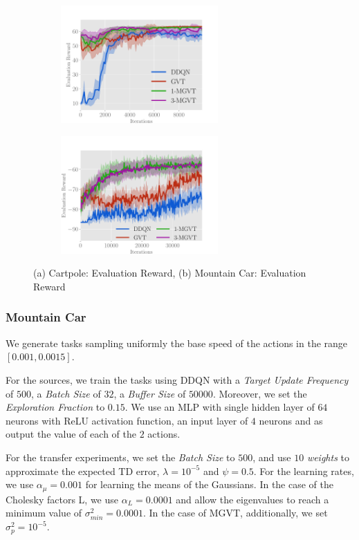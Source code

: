 \documentclass{article}
\begin{document}
\begin{figure}[t]
  \begin{subfigure}[b]{0.45\textwidth}
    \includegraphics[trim=0.5cm 0cm 1.8cm 1.3cm,clip=true,height=4.5cm]{images/cartpole/erew.pdf}
    \caption{}
    \label{fig:cp-erew}
  \end{subfigure}
  \begin{subfigure}[b]{0.45\textwidth}
    \includegraphics[trim=0.5cm 0cm 1.8cm 1.3cm,clip=true,height=4.5cm]{images/mountaincar/erew.pdf}
    \caption{}
    \label{fig:mc-erew}
  \end{subfigure}
  \caption{(a) Cartpole: Evaluation Reward, (b) Mountain Car: Evaluation Reward}
  \label{fig:ccerew}
\end{figure}

\subsubsection{Mountain Car}

We generate tasks sampling uniformly the base speed of the actions in the range $\left[0.001, 0.0015\right]$. 

For the sources, we train the tasks using DDQN with a \textit{Target Update Frequency} of $500$, a \textit{Batch Size} of $32$, a  \textit{Buffer Size} of $50000$. Moreover, we set the \textit{Exploration Fraction} to $0.15$. We use an MLP with single hidden layer of $64$ neurons with ReLU activation function, an input layer of $4$ neurons and as output the value of each of the $2$ actions. 

For the transfer experiments, we set the \textit{Batch Size} to $500$, and use $10$ \textit{weights} to approximate the expected TD error, $\lambda=10^{-5}$ and $\psi=0.5$. For the learning rates, we use $\alpha_{\mu}=0.001$ for learning the means of the Gaussians. In the case of the Cholesky factors L, we use $\alpha_L=0.0001$ and allow the eigenvalues to reach a minimum value of $\sigma_{min}^2=0.0001$. In the case of MGVT, additionally, we set $\sigma_p^2=10^{-5}$.
\end{document}
